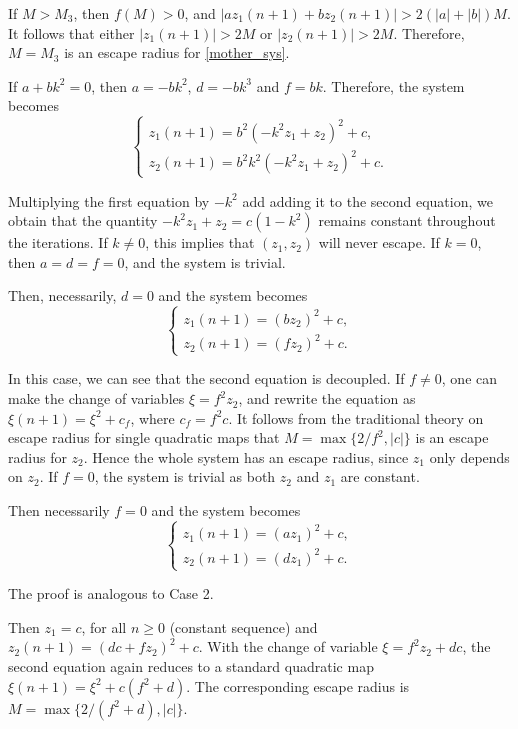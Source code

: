 \documentclass[10pt]{article}
\begin{document}
\begin{description}
\begin{description}
    If $M > M_3$, then $f(M) > 0$, and $|a z_1(n+1) + b z_2(n+1)| > 2(|a| + |b|)M$. It follows that either $|z_1(n + 1)| > 2M$ or $|z_2(n + 1)| > 2M$. Therefore,
    $M = M_3$ is an escape radius for \eqref{mother_sys}.

    \item[Case (ii).] If $a + b k^2 = 0$, then $a = -b k^2$, $d = -b k^3$ and $f = b k$. Therefore, the system becomes
    \[
    \begin{cases}
    z_1(n+1) = b^2 (-k^2 z_1 + z_2)^2 + c, \\
    z_2(n+1) = b^2 k^2 (-k^2 z_1 + z_2)^2 + c.
    \end{cases}
    \]

    Multiplying the first equation by $-k^2$ add adding it to the second equation,
    we obtain that the quantity $-k^2 z_1 + z_2 = c (1 - k^2)$ remains constant
    throughout the iterations. If $k\neq 0$, this implies that $(z_1, z_2)$ will never escape. If $k=0$, then $a=d=f=0$, and the system is trivial.
\end{description}

\item[Case 2 $(a = 0, b \ne 0)$.]
Then, necessarily, $d = 0$ and the system becomes
\[
\begin{cases}
z_1(n+1) = (bz_2)^2 + c, \\
z_2(n+1) = (fz_2)^2 + c.
\end{cases}
\]

In this case, we can see that the second equation is decoupled. If $f \neq 0$, one can make the change of variables $\xi = f^2 z_2$, and rewrite the equation as $\xi(n+1) = \xi^2 + c_f$, where $c_f = f^2 c$. It follows from the traditional theory on escape radius for single quadratic maps that $M = \max\{2 / f^2, |c|\}$ is an escape radius for $z_2$. Hence the whole system has an escape radius, since $z_1$ only depends on $z_2$. If $f = 0$, the system is trivial as both $z_2$ and $z_1$ are constant.

\item[Case 3 $(a \ne 0, b = 0)$.] Then necessarily $f = 0$ and the system becomes
\[
\begin{cases}
z_1(n + 1) = (a z_1)^2 + c, \\
z_2(n + 1)=(d z_1)^2 + c.
\end{cases}
\]

The proof is analogous to Case 2.

\item[Case 4 $(a = b = 0)$.]
Then $z_1 = c$, for all $n \geq 0$ (constant sequence) and $z_2(n + 1)= (d c + f z_2)^2 + c$. With the change of variable $\xi = f^2 z_2 + d c$, the second equation again reduces to a standard quadratic map $\xi(n + 1) = \xi^2 + c (f^2 + d)$. The
corresponding escape radius is $M = \max\{2 / (f^2 + d), |c|\}$.
\end{description}
\end{document}
